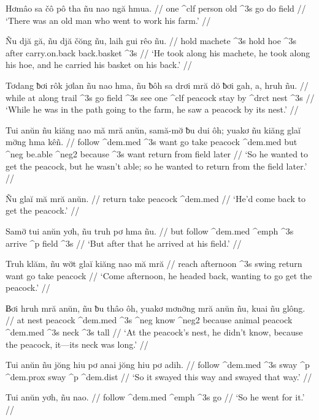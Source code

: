 

\gla Hơmâo sa čô pô tha ñu nao ngă hmua. //
 one {\sc^clf} person old {\sc^3s} go do field //
\glft `There was an old man who went to work his farm.' //


\gla Ñu djă gă, ñu djă čŏng ñu, laih gui rêo ñu. //
 hold machete {\sc^3s} hold hoe {\sc^3s} after carry.on.back back.basket {\sc^3s} //
\glft `He took along his machete, he took along his hoe, and he carried his basket on his back.' //


\gla Tơdang ƀơi rôk jơlan ñu nao hma, ñu ƀôh sa drơi mră dŏ ƀơi gah, a, hruh ñu. //
\glb while at along trail {\sc^3s} go field {\sc^3s} see one {\sc^clf} peacock stay by {\sc^drct} {} nest {\sc^3s} //
\glft `While he was in the path going to the farm, he saw a peacock by its nest.' //


\gla Tui anŭn ñu kiăng nao mă mră anŭn, samă-mơ̆ ƀu dui ôh; yuakơ ñu kiăng glaĭ mơ̆ng hma kêñ. //
\glb follow {\sc^dem.med} {\sc^3s} want go take peacock {\sc^dem.med} but {\sc^neg} be.able {\sc^neg2} because {\sc^3s} want return from field later //
\glft `So he wanted to get the peacock, but he wasn't able; so he wanted to return from the field later.' //


\gla Ñu glaĭ mă mră anŭn. //
 return take peacock {\sc^dem.med} //
\glft `He’d come back to get the peacock.' //


\gla Samơ̆ tui anŭn yơh, ñu truh pơ hma ñu. //
\glb but follow {\sc^dem.med} {\sc^emph} {\sc^3s} arrive {\sc^p} field {\sc^3s} //
\glft `But after that he arrived at his field.' //


\gla Truh klăm, ñu wơ̆t glaĭ kiăng nao mă mră //
\glb reach afternoon {\sc^3s} swing return want go take peacock //
\glft `Come afternoon, he headed back, wanting to go get the peacock.' //


\gla Ƀơi hruh mră anŭn, ñu ƀu thâo ôh, yuakơ mơnơ̆ng mră anŭn ñu, kuai ñu glông. //
\glb at nest peacock {\sc^dem.med} {\sc^3s} {\sc^neg} know {\sc^neg2} because animal peacock {\sc^dem.med} {\sc^3s} neck {\sc^3s} tall //
\glft `At the peacock's nest, he didn't know, because the peacock, it---its neck was long.' //


\gla Tui anŭn ñu {jŏng hiu} pơ anai {jŏng hiu} pơ adih. //
\glb follow {\sc^dem.med} {\sc^3s} sway {\sc^p} \sc^dem.prox sway {\sc^p} {\sc^dem.dist} //
\glft `So it swayed this way and swayed that way.' //


\gla Tui anŭn yơh, ñu nao. //
\glb follow {\sc^dem.med} {\sc^emph} {\sc^3s} go //
\glft `So he went for it.' //


